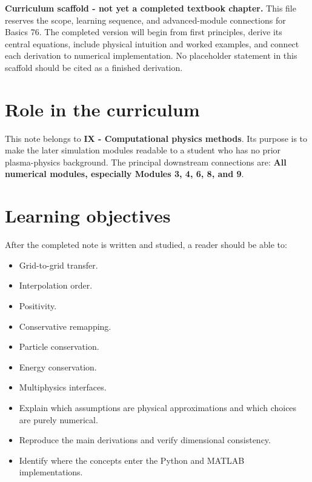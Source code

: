 \documentclass[11pt]{article}
\begin{document}

\begin{overviewbox}
\textbf{Curriculum scaffold - not yet a completed textbook chapter.} This file reserves the scope, learning sequence, and advanced-module connections for Basics 76. The completed version will begin from first principles, derive its central equations, include physical intuition and worked examples, and connect each derivation to numerical implementation. No placeholder statement in this scaffold should be cited as a finished derivation.
\end{overviewbox}

\ProjectTOC

\section{Role in the curriculum}
This note belongs to \textbf{IX - Computational physics methods}. Its purpose is to make the later simulation modules readable to a student who has no prior plasma-physics background. The principal downstream connections are: \textbf{All numerical modules, especially Modules 3, 4, 6, 8, and 9}.

\section{Learning objectives}
After the completed note is written and studied, a reader should be able to:
\begin{itemize}[leftmargin=1.6em]
\item Grid-to-grid transfer.
\item Interpolation order.
\item Positivity.
\item Conservative remapping.
\item Particle conservation.
\item Energy conservation.
\item Multiphysics interfaces.
\item Explain which assumptions are physical approximations and which choices are purely numerical.
\item Reproduce the main derivations and verify dimensional consistency.
\item Identify where the concepts enter the Python and MATLAB implementations.
\end{itemize}
\end{document}
